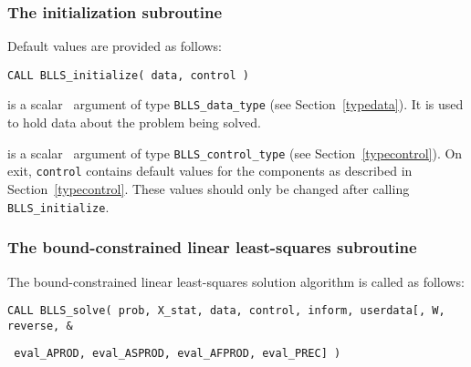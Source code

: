 \documentclass{galahad}
\newcommand{\packagename}{BLLS}
\begin{document}

\subsubsection{The initialization subroutine}\label{subinit}
 Default values are provided as follows:
\vspace*{1mm}

\hspace{8mm}
{\tt CALL \packagename\_initialize( data, control )}

\vspace*{-3mm}
\begin{description}

 is a scalar \intentinout\ argument of type
{\tt \packagename\_data\_type}
(see Section~\ref{typedata}). It is used to hold data about the problem being
solved.

 is a scalar \intentout\ argument of type
{\tt \packagename\_control\_type}
(see Section~\ref{typecontrol}).
On exit, {\tt control} contains default values for the components as
described in Section~\ref{typecontrol}.
These values should only be changed after calling
{\tt \packagename\_initialize}.

\end{description}


\subsubsection{The bound-constrained linear least-squares subroutine}\label{qps}
The bound-constrained linear least-squares solution algorithm is called
as follows:
\vspace*{1mm}

\hspace{8mm}
{\tt CALL \packagename\_solve( prob, X\_stat, data, control, inform, userdata[,
W, reverse, %
\&}
\vspace*{-1mm}

\hspace{37mm}
{\tt
eval\_APROD, eval\_ASPROD, eval\_AFPROD, eval\_PREC] )}
\end{document}

